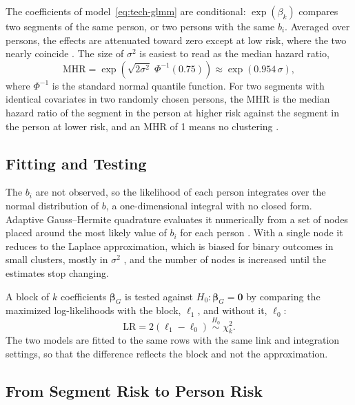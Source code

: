 The coefficients of model~\eqref{eq:tech-glmm} are conditional: $\exp(\beta_k)$ compares two segments of the same person, or two persons with the same $b_i$.
Averaged over persons, the effects are attenuated toward zero except at low risk, where the two nearly coincide \cite{pavlou2015marginal}.
The size of $\sigma^2$ is easiest to read as the median hazard ratio,
\begin{equation}
  \mathrm{MHR} = \exp\!\left(\sqrt{2\sigma^2}\;\Phi^{-1}(0.75)\right) \approx \exp(0.954\,\sigma),
  \label{eq:tech-mhr}
\end{equation}
where $\Phi^{-1}$ is the standard normal quantile function.
For two segments with identical covariates in two randomly chosen persons, the MHR is the median hazard ratio of the segment in the person at higher risk against the segment in the person at lower risk, and an MHR of 1 means no clustering \cite{austin2017mhr}.

\subsection{Fitting and Testing}
\label{sec:tech-glmm-likelihood}

The $b_i$ are not observed, so the likelihood of each person integrates over the normal distribution of $b$, a one-dimensional integral with no closed form.
Adaptive Gauss--Hermite quadrature evaluates it numerically from a set of nodes placed around the most likely value of $b_i$ for each person \cite{liu1994gausshermite}.
With a single node it reduces to the Laplace approximation, which is biased for binary outcomes in small clusters, mostly in $\sigma^2$ \cite{joe2008laplace, statacorp2025mecloglog}, and the number of nodes is increased until the estimates stop changing.

A block of $k$ coefficients $\boldsymbol{\beta}_G$ is tested against $H_0\colon \boldsymbol{\beta}_G = \mathbf{0}$ by comparing the maximized log-likelihoods with the block, $\ell_1$, and without it, $\ell_0$:
\begin{equation}
  \mathrm{LR} = 2\left(\ell_1 - \ell_0\right) \;\overset{H_0}{\sim}\; \chi^2_k .
  \label{eq:tech-lr}
\end{equation}
The two models are fitted to the same rows with the same link and integration settings, so that the difference reflects the block and not the approximation.

\subsection{From Segment Risk to Person Risk}
\label{sec:tech-aggregation}

